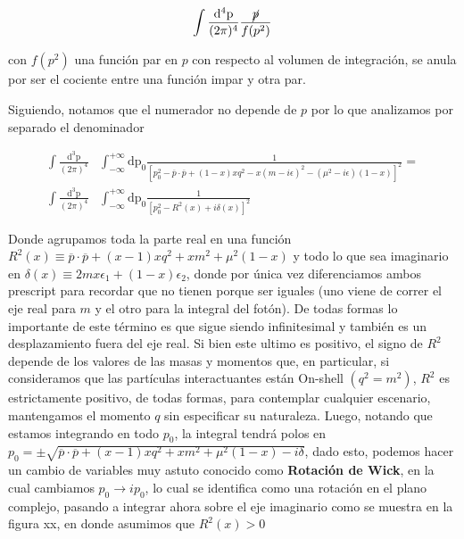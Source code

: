 \documentclass{article}
\numberwithin{equation}{section}
\begin{document}
\begin{equation}\label{key}
\int\frac{\mathrm{d^{4}p}}{(2\pi)^{4}} \frac{\cancel{p}}{f(p^2)}
\end{equation}

con $ f(p^2) $ una función par en $ p $ con respecto al volumen de integración, se anula por ser el cociente entre una función impar y otra par. 

Siguiendo, notamos que el numerador no depende de $ p $ por lo que analizamos por separado el denominador

\begin{equation}
\begin{aligned}
\int\frac{\mathrm{d^{3}p}}{(2\pi)^{4}}&\int_{-\infty}^{+\infty}\mathrm{dp_{0}}\frac{1}{\left[p_{0}^{2}-\overline{p}\cdot\overline{p}+(1-x)xq^{2}-x(m-i\epsilon)^{2}-(\mu^{2}-i\epsilon)(1-x)\right]^{2}}=\\
\int\frac{\mathrm{d^{3}p}}{(2\pi)^{4}}&\int_{-\infty}^{+\infty}\mathrm{dp_{0}}\frac{1}{\left[p_{0}^{2}-R^{2}(x)+i\delta(x)\right]^{2}}
\end{aligned}
\end{equation}

Donde agrupamos toda la parte real en una función $R^{2}(x) \equiv \overline{p}\cdot\overline{p}+(x-1)xq^{2} + x m^{2} + \mu^{2}(1-x) $
y todo lo que sea imaginario en $\delta(x) \equiv 2mx\epsilon_1 + (1-x)\epsilon_2$, donde por única vez diferenciamos ambos prescript para recordar que no tienen porque ser iguales (uno viene de correr el eje real para $ m $ y el otro para la integral del fotón). De todas formas lo importante de este término es que sigue siendo infinitesimal y también es un desplazamiento
fuera del eje real. Si bien este ultimo es positivo, el signo de $R^{2}$
depende de los valores de las masas y momentos que, en particular, si consideramos que las partículas interactuantes están On-shell $(q^2=m^2)  $, $ R^2 $ es estrictamente positivo, de todas formas, para contemplar cualquier escenario, mantengamos el momento $ q $ sin especificar su naturaleza. Luego, notando que estamos integrando en todo $p_{0}$, la integral tendrá polos en
$p_{0}=\pm\sqrt{\overline{p}\cdot\overline{p}+(x-1)xq^{2} + x m^{2} + \mu^{2}(1-x)-i\delta}$, dado esto, podemos hacer un cambio de variables muy astuto conocido
como \textbf{Rotación de Wick}, en la cual cambiamos $p_{0}\rightarrow ip_{0}$, lo cual se identifica como una rotación en el plano complejo, pasando a integrar ahora sobre  el eje imaginario como se muestra en la figura xx, en donde asumimos
que $R^{2}(x)>0$\\
\end{document}

